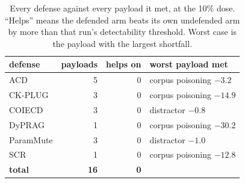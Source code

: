 \begin{table}[t]
\centering
\caption{Every defense against every payload it met, at the 10\% dose. ``Helps'' means the defended arm beats its own undefended arm by more than that run's detectability threshold. Worst case is the payload with the largest shortfall.}
\label{tab:lowdose}
\small
\begin{tabular}{@{}lrrl@{}}
\toprule
defense & payloads & helps on & worst payload met \\
\midrule
ACD       & 5 & 0 & corpus poisoning \;\; $-3.2$ \\
CK-PLUG   & 3 & 0 & corpus poisoning \;\; $-14.9$ \\
COIECD    & 3 & 0 & distractor \;\; $-0.8$ \\
DyPRAG    & 1 & 0 & corpus poisoning \;\; $-30.2$ \\
ParamMute & 3 & 0 & distractor \;\; $-1.0$ \\
SCR       & 1 & 0 & corpus poisoning \;\; $-12.8$ \\
\midrule
\textbf{total} & \textbf{16} & \textbf{0} & \\
\bottomrule
\end{tabular}
\end{table}
